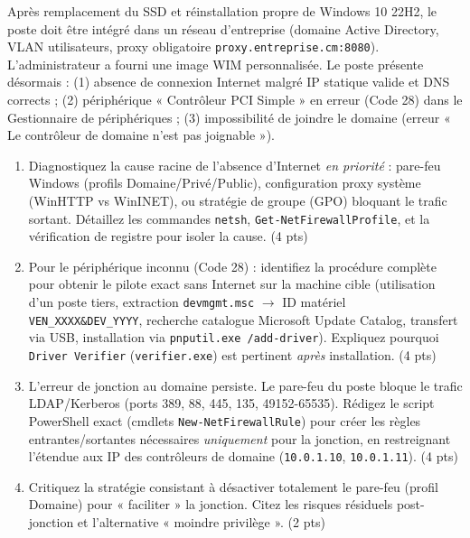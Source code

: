 \documentclass[11pt]{article}
\begin{document}
\begin{exercice}
Après remplacement du SSD et réinstallation propre de Windows 10 22H2, le poste doit être intégré dans un réseau d'entreprise (domaine Active Directory, VLAN utilisateurs, proxy obligatoire \texttt{proxy.entreprise.cm:8080}). L'administrateur a fourni une image WIM personnalisée. Le poste présente désormais : (1) absence de connexion Internet malgré IP statique valide et DNS corrects ; (2) périphérique « Contrôleur PCI Simple » en erreur (Code 28) dans le Gestionnaire de périphériques ; (3) impossibilité de joindre le domaine (erreur « Le contrôleur de domaine n'est pas joignable »).

\begin{enumerate}
    \item Diagnostiquez la cause racine de l'absence d'Internet \textit{en priorité} : pare-feu Windows (profils Domaine/Privé/Public), configuration proxy système (WinHTTP vs WinINET), ou stratégie de groupe (GPO) bloquant le trafic sortant. Détaillez les commandes \texttt{netsh}, \texttt{Get-NetFirewallProfile}, et la vérification de registre pour isoler la cause. (4 pts)
    \item Pour le périphérique inconnu (Code 28) : identifiez la procédure complète pour obtenir le pilote exact sans Internet sur la machine cible (utilisation d'un poste tiers, extraction \texttt{devmgmt.msc} $\to$ ID matériel \texttt{VEN\_XXXX\&DEV\_YYYY}, recherche catalogue Microsoft Update Catalog, transfert via USB, installation via \texttt{pnputil.exe /add-driver}). Expliquez pourquoi \texttt{Driver Verifier} (\texttt{verifier.exe}) est pertinent \textit{après} installation. (4 pts)
    \item L'erreur de jonction au domaine persiste. Le pare-feu du poste bloque le trafic LDAP/Kerberos (ports 389, 88, 445, 135, 49152-65535). Rédigez le script PowerShell exact (cmdlets \texttt{New-NetFirewallRule}) pour créer les règles entrantes/sortantes nécessaires \textit{uniquement} pour la jonction, en restreignant l'étendue aux IP des contrôleurs de domaine (\texttt{10.0.1.10}, \texttt{10.0.1.11}). (4 pts)
    \item Critiquez la stratégie consistant à désactiver totalement le pare-feu (profil Domaine) pour « faciliter » la jonction. Citez les risques résiduels post-jonction et l'alternative « moindre privilège ». (2 pts)
\end{enumerate}
\end{exercice}
\end{document}
